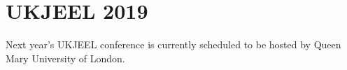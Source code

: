 \section{UKJEEL 2019}
Next year's UKJEEL conference is currently scheduled to 
be hosted by Queen Mary University of London. 
